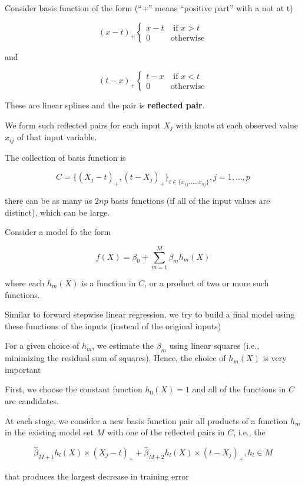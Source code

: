 \documentclass[
]{book}
\begin{document}
Consider basis function of the form (``+'' means ``positive part'' with a not at t)

\[
(x-t)_+
\begin{cases}
x-t & \text{ if } x > t \\
0 & \text{otherwise}
\end{cases}
\]

and

\[
(t-x)_+
\begin{cases}
t- x & \text{ if } x < t \\
0 & \text{otherwise}
\end{cases}
\]

These are linear splines and the pair is \textbf{reflected pair}.

We form such reflected pairs for each input \(X_j\) with knots at each observed value \(x_{ij}\) of that input variable.

The collection of basis function is

\[
C = \{(X_j - t)_+ , (t-X_j)_+\}_{t \in \{x_{1j}, \dots, x_{nj} \}}, j = 1, \dots, p
\]

there can be as many as \(2np\) basis functions (if all of the input values are distinct), which can be large.

Consider a model fo the form

\[
f(X) = \beta_0 + \sum_{m=1}^M \beta_m h_m (X) 
\]

where each \(h_m(X)\) is a function in \(C\), or a product of two or more such functions.

Similar to forward stepwise linear regression, we try to build a final model using these functions of the inputs (instead of the original inputs)

For a given choice of \(h_m\), we estimate the \(\beta_m\) using linear squares (i.e., minimizing the residual sum of squares). Hence, the choice of \(h_m(X)\) is very important

First, we choose the constant function \(h_0(X) =1\) and all of the functions in \(C\) are candidates.

At each stage, we consider a new basis function pair all products of a function \(h_m\) in the existing model set \(M\) with one of the reflected pairs in \(C\), i.e., the

\[
\hat{\beta}_{M + 1} h_l(X) \times (X_j -t)_+ + \hat{\beta}_{M + 2} h_l(X) \times (t - X_j )_+, h_l \in M
\]

that produces the largest decrease in training error
\end{document}
